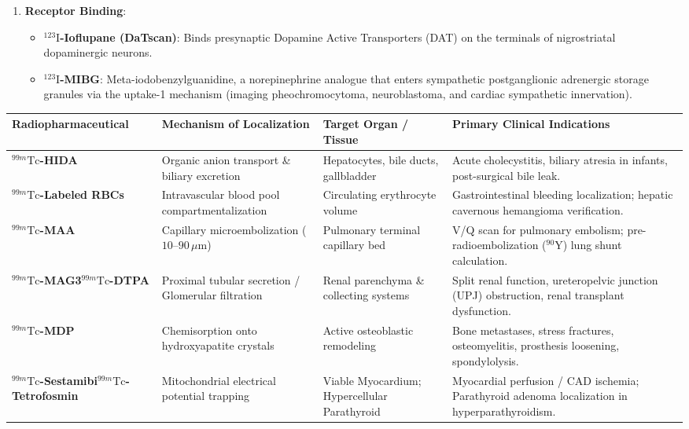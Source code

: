 \documentclass[11pt,a4paper]{article}
\begin{document}
\begin{enumerate}[leftmargin=*]
    \item \textbf{Receptor Binding}:
    \begin{itemize}
        \item \textbf{$^{123}\text{I}$-Ioflupane (DaTscan)}: Binds presynaptic Dopamine Active Transporters (DAT) on the terminals of nigrostriatal dopaminergic neurons.
        \item \textbf{$^{123}\text{I}$-MIBG}: Meta-iodobenzylguanidine, a norepinephrine analogue that enters sympathetic postganglionic adrenergic storage granules via the uptake-1 mechanism (imaging pheochromocytoma, neuroblastoma, and cardiac sympathetic innervation).
    \end{itemize}
\end{enumerate}

\begin{table}[htbp]
\centering
\small
\renewcommand{\arraystretch}{1.25}
\begin{tabular}{p{3.5cm}p{3.2cm}p{3.2cm}p{5.5cm}}
\toprule
\textbf{Radiopharmaceutical} & \textbf{Mechanism of Localization} & \textbf{Target Organ / Tissue} & \textbf{Primary Clinical Indications} \\
\midrule
\textbf{$^{99m}\text{Tc}$-HIDA} & Organic anion transport \& biliary excretion & Hepatocytes, bile ducts, gallbladder & Acute cholecystitis, biliary atresia in infants, post-surgical bile leak. \\
\textbf{$^{99m}\text{Tc}$-Labeled RBCs} & Intravascular blood pool compartmentalization & Circulating erythrocyte volume & Gastrointestinal bleeding localization; hepatic cavernous hemangioma verification. \\
\textbf{$^{99m}\text{Tc}$-MAA} & Capillary microembolization ($10\text{--}90\,\mu\text{m}$) & Pulmonary terminal capillary bed & V/Q scan for pulmonary embolism; pre-radioembolization ($^{90}\text{Y}$) lung shunt calculation. \\
\textbf{$^{99m}\text{Tc}$-MAG3}\newline \textbf{$^{99m}\text{Tc}$-DTPA} & Proximal tubular secretion / Glomerular filtration & Renal parenchyma \& collecting systems & Split renal function, ureteropelvic junction (UPJ) obstruction, renal transplant dysfunction. \\
\textbf{$^{99m}\text{Tc}$-MDP} & Chemisorption onto hydroxyapatite crystals & Active osteoblastic remodeling & Bone metastases, stress fractures, osteomyelitis, prosthesis loosening, spondylolysis. \\
\textbf{$^{99m}\text{Tc}$-Sestamibi}\newline \textbf{$^{99m}\text{Tc}$-Tetrofosmin} & Mitochondrial electrical potential trapping & Viable Myocardium; Hypercellular Parathyroid & Myocardial perfusion / CAD ischemia; Parathyroid adenoma localization in hyperparathyroidism. \\

\end{tabular}
\end{table}
\end{document}
